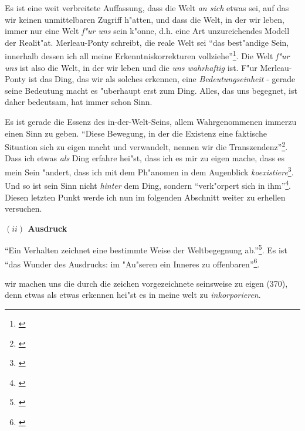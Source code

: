 \documentclass[a4paper, emulatestandardclasses, 12pt]{scrartcl}
\begin{document}
\begin{onehalfspace}
\noindent Es ist eine weit verbreitete Auffassung, dass die Welt \emph{an sich} etwas sei, auf das wir keinen unmittelbaren Zugriff h"atten, und dass die Welt, in der wir leben, immer nur eine Welt \emph{f"ur uns} sein k"onne, d.h. eine Art unzureichendes Modell der Realit"at. Merleau-Ponty schreibt, die reale Welt sei "`das best"andige Sein, innerhalb dessen ich all meine Erkenntniskorrekturen vollziehe"'\footnote{\cite[S. 379]{merleau1966phanomenologie}}. Die Welt \emph{f"ur uns} ist also die Welt, in der wir leben und die \emph{uns wahrhaftig} ist. F"ur Merleau-Ponty ist das Ding, das wir als solches erkennen, eine \emph{Bedeutungseinheit} - gerade seine Bedeutung macht es "uberhaupt erst zum Ding. Alles, das uns begegnet, ist daher bedeutsam, hat immer schon Sinn.

Es ist gerade die Essenz des in-der-Welt-Seins, allem Wahrgenommenen immerzu einen Sinn zu geben. "`Diese Bewegung, in der die Existenz eine faktische Situation sich zu eigen macht und verwandelt, nennen wir die Transzendenz"'\footnote{\cite[S. 202]{merleau1966phanomenologie}}. Dass ich etwas \emph{als} Ding erfahre hei"st, dass ich es mir zu eigen mache, dass es mein Sein "andert, dass ich mit dem Ph"anomen in dem Augenblick \emph{koexistiere}\footnote{\cite[vgl.][S. 368]{merleau1966phanomenologie}}. Und so ist sein Sinn nicht \emph{hinter} dem Ding, sondern "`verk"orpert sich in ihm"'\footnote{\cite[S. 370]{merleau1966phanomenologie}}. Diesen letzten Punkt werde ich nun im folgenden Abschnitt weiter zu erhellen versuchen. 

\vspace{5mm}

\noindent\textbf{$(ii)$ Ausdruck}

\noindent "`Ein Verhalten zeichnet eine bestimmte Weise der Weltbegegnung ab."'\footnote{\cite[S. 370]{merleau1966phanomenologie}}. Es ist "`das Wunder des Ausdrucks: im "Au"seren ein Inneres zu offenbaren"'\footnote{\cite[S. 370]{merleau1966phanomenologie}}.

wir machen uns die durch die zeichen vorgezeichnete seinsweise zu eigen (370), denn etwas als etwas erkennen hei"st es in meine welt zu \emph{inkorporieren}.



\end{onehalfspace}
\end{document}
